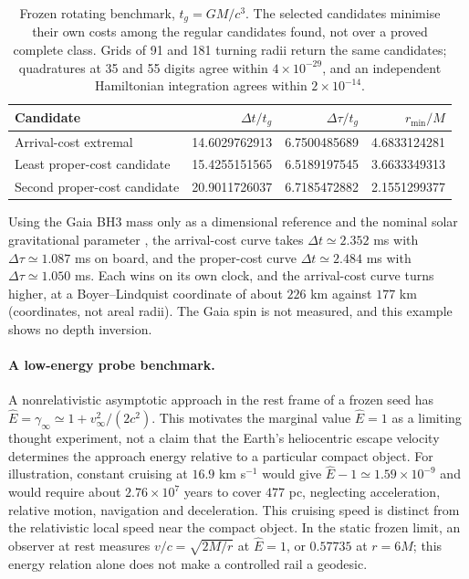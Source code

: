 \documentclass[12pt]{iopart}
\theoremstyle{plain}
\theoremstyle{definition}
\theoremstyle{remark}
\newcommand{\Ehat}{\hat E}
\begin{document}
\begin{table}[ht]
\centering\small
\begin{tabular}{lrrr}
\hline
Candidate & $\Delta t/t_g$ & $\Delta\tau/t_g$ & $r_{\min}/M$\\
\hline
Arrival-cost extremal & 14.6029762913 & 6.7500485689 & 4.6833124281\\
Least proper-cost candidate & 15.4255151565 & 6.5189197545 & 3.6633349313\\
Second proper-cost candidate & 20.9011726037 & 6.7185472882 & 2.1551299377\\
\hline
\end{tabular}
\caption{Frozen rotating benchmark, $t_g=GM/c^3$. The selected candidates
minimise their own costs among the regular candidates found, not over a proved
complete class. Grids of 91 and 181 turning radii return the same candidates;
quadratures at 35 and 55 digits agree within $4\times10^{-29}$, and an independent
Hamiltonian integration agrees within $2\times10^{-14}$.}
\label{tab:rotating-observational-benchmark}
\end{table}

Using the Gaia BH3 mass only as a dimensional reference and the nominal solar
gravitational parameter \cite{Prsa2016}, the arrival-cost curve takes
$\Delta t\simeq2.352$ ms with $\Delta\tau\simeq1.087$ ms on board, and the
proper-cost curve $\Delta t\simeq2.484$ ms with $\Delta\tau\simeq1.050$ ms. Each
wins on its own clock, and the arrival-cost curve turns higher, at a
Boyer--Lindquist coordinate of about $226$ km against $177$ km (coordinates, not
areal radii). The Gaia spin is not measured, and this example shows no depth
inversion.

\paragraph{A low-energy probe benchmark.}
A nonrelativistic asymptotic approach in the rest frame of a frozen seed
has $\Ehat=\gamma_\infty\simeq1+v_\infty^2/(2c^2)$.
This motivates the marginal value $\Ehat=1$ as a limiting thought
experiment, not a claim that the Earth's heliocentric escape velocity
determines the approach energy relative to a particular compact object.
For illustration, constant cruising at $16.9$ km s$^{-1}$ would give
$\Ehat-1\simeq1.59\times10^{-9}$ and would require about
$2.76\times10^7$ years to cover $477$ pc, neglecting acceleration,
relative motion, navigation and deceleration. This cruising speed is
distinct from the relativistic local speed near the compact object.
In the static frozen limit, an observer at rest measures
$v/c=\sqrt{2M/r}$ at $\Ehat=1$, or $0.57735$ at $r=6M$;
this energy relation alone does not make a controlled rail a geodesic.
\end{document}
